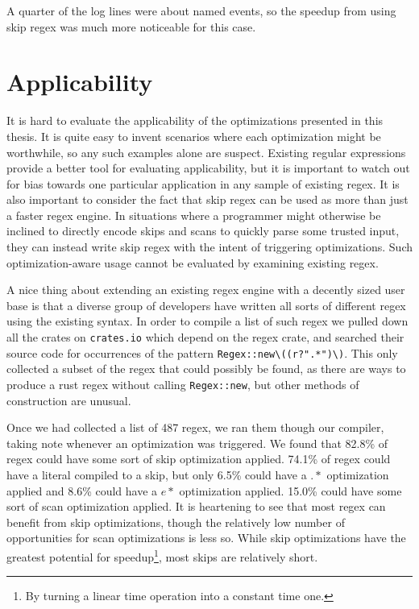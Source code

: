 A quarter of the log lines were about named events, so the speedup
from using skip regex was much more noticeable for this case.

\section{Applicability}

It is hard to evaluate the applicability of the optimizations presented
in this thesis. It is quite easy to invent scenarios where each
optimization might be worthwhile, so any such examples alone are
suspect. Existing regular expressions provide a better tool for
evaluating applicability, but it is important to watch out for
bias towards one particular application in any sample of existing
regex. It is also important to consider the fact that skip regex
can be used as more than just a faster regex engine. In situations
where a programmer might otherwise be inclined to directly encode
skips and scans to quickly parse some trusted input, they can
instead write skip regex with the intent of triggering optimizations.
Such optimization-aware usage cannot be evaluated by examining
existing regex.

A nice thing about extending an existing regex engine
with a decently sized user base is that a diverse group of developers
have written all sorts of different regex using the existing syntax.
In order to compile a list of such regex we pulled down all the
crates on \verb'crates.io' which depend on the regex crate, and
searched their source code for occurrences of the pattern
\verb'Regex::new\((r?".*")\)'. This only collected a subset of
the regex that could possibly be found, as there are ways to
produce a rust regex without calling \verb'Regex::new', but
other methods of construction are unusual.

Once we had collected
a list of 487 regex, we ran them though our compiler, taking
note whenever an optimization was triggered. We found that
82.8\% of regex could have some sort of skip optimization
applied. 74.1\% of regex could have a literal compiled to a skip,
but only 6.5\% could have a $.*$ optimization applied and 8.6\% could
have a $e*$ optimization applied. 15.0\% could have some sort of
scan optimization applied. It is heartening to see that most regex
can benefit from skip optimizations, though the relatively low number
of opportunities for scan optimizations is less so. While skip
optimizations have the greatest potential for speedup\footnote{By turning
a linear time operation into a constant time one.}, most skips
are relatively short.

